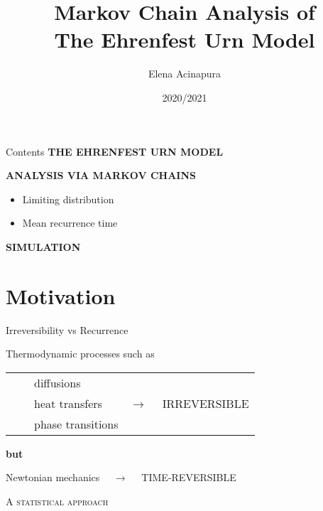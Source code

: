\documentclass[usenames,dvipsnames]{beamer}
\title{Markov Chain Analysis of \\The Ehrenfest Urn Model}
\date{2020/2021}
\author{Elena Acinapura}
\institute{Università di Trento}
\newcommand{\tabitem}{~~\llap{\textbullet}~~}
\begin{document}
  \maketitle

  \begin{frame}{Contents}
    \MakeUppercase{\textbf{The Ehrenfest urn model}}

    \bigskip
    \MakeUppercase{\textbf{Analysis via Markov chains}}
      \begin{itemize}
        \item Limiting distribution
        \item Mean recurrence time
      \end{itemize}
      \bigskip
    \MakeUppercase{\textbf{Simulation}}
  \end{frame}

  \section{Motivation}
  \begin{frame}{Irreversibility vs Recurrence}
    \begin{center}
      Thermodynamic processes such as
    \end{center}
    \begin{table}
        \begin{center}
        \begin{tabular}{l c}
            \tabitem diffusions & \\
            \tabitem heat transfers & $\rightarrow \quad $ \alert{\MakeUppercase{irreversible}}\\
            \tabitem phase transitions & 
        \end{tabular}
        \end{center}
    \end{table}
    
    \begin{center}
        \textbf{but}
    \end{center}
    
    \begin{center}
    Newtonian mechanics $\quad \rightarrow \quad$ \alert{\MakeUppercase{time-reversible}}
    \end{center}
  \end{frame}

  \begin{frame}[standout]
    \textsc{A statistical approach}
  \end{frame}
  
\end{document}
